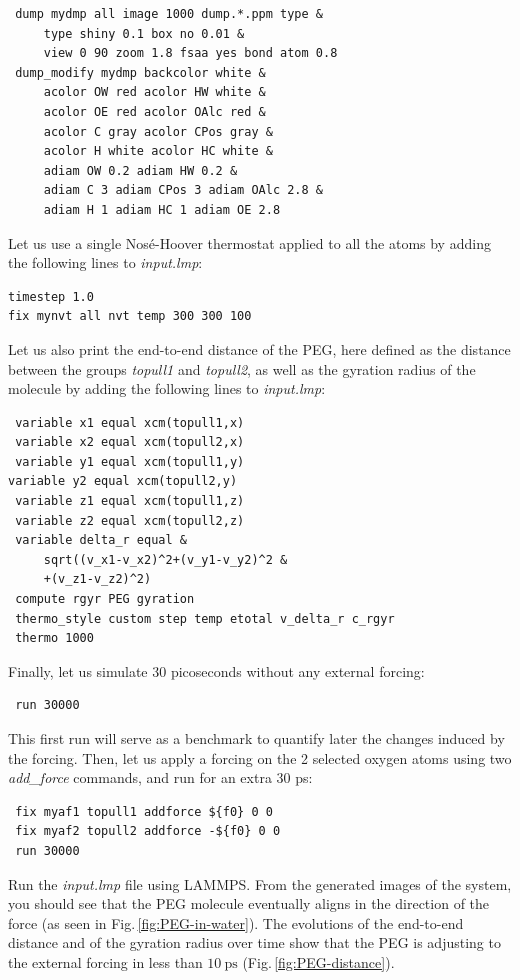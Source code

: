 \documentclass[9pt,tutorial]{livecoms}
\begin{document}
{\normalsize \begin{verbatim}
 dump mydmp all image 1000 dump.*.ppm type &
     type shiny 0.1 box no 0.01 &
     view 0 90 zoom 1.8 fsaa yes bond atom 0.8
 dump_modify mydmp backcolor white &
     acolor OW red acolor HW white &
     acolor OE red acolor OAlc red &
     acolor C gray acolor CPos gray &
     acolor H white acolor HC white &
     adiam OW 0.2 adiam HW 0.2 &
     adiam C 3 adiam CPos 3 adiam OAlc 2.8 &
     adiam H 1 adiam HC 1 adiam OE 2.8
\end{verbatim}}
Let us use a single Nosé-Hoover thermostat applied to all the atoms by adding the
following lines to \textit{input.lmp}:
{\normalsize \begin{verbatim}
timestep 1.0
fix mynvt all nvt temp 300 300 100
\end{verbatim}}
Let us also print the end-to-end distance of the PEG,
here defined as the distance between the groups \textit{topull1}
and \textit{topull2}, as well as the gyration
radius of the molecule \cite{fixmanRadiusGyrationPolymer1962a}
by adding the following lines to \textit{input.lmp}:
{\normalsize \begin{verbatim}
 variable x1 equal xcm(topull1,x)
 variable x2 equal xcm(topull2,x)
 variable y1 equal xcm(topull1,y)
variable y2 equal xcm(topull2,y)
 variable z1 equal xcm(topull1,z)
 variable z2 equal xcm(topull2,z)
 variable delta_r equal &
     sqrt((v_x1-v_x2)^2+(v_y1-v_y2)^2 &
     +(v_z1-v_z2)^2)
 compute rgyr PEG gyration
 thermo_style custom step temp etotal v_delta_r c_rgyr
 thermo 1000
\end{verbatim}}
Finally, let us simulate 30 picoseconds without any external forcing:
{\normalsize \begin{verbatim}
 run 30000
\end{verbatim}}
This first run will serve as a benchmark to quantify later the changes induced
by the forcing. Then, let us apply a forcing on the 2 selected oxygen atoms using two
\textit{add\_force} commands, and run for an extra 30 ps:
{\normalsize \begin{verbatim}
 fix myaf1 topull1 addforce ${f0} 0 0
 fix myaf2 topull2 addforce -${f0} 0 0
 run 30000
\end{verbatim}}
Run the \textit{input.lmp} file using LAMMPS. From the generated images of the system,
you should see that the PEG molecule eventually aligns
in the direction of the force (as seen in Fig.\,\ref{fig:PEG-in-water}).
The evolutions of the end-to-end distance and of the gyration radius over
time show that the PEG is adjusting to the external forcing in less than
$10~\text{ps}$ (Fig.\,\ref{fig:PEG-distance}).
\end{document}
